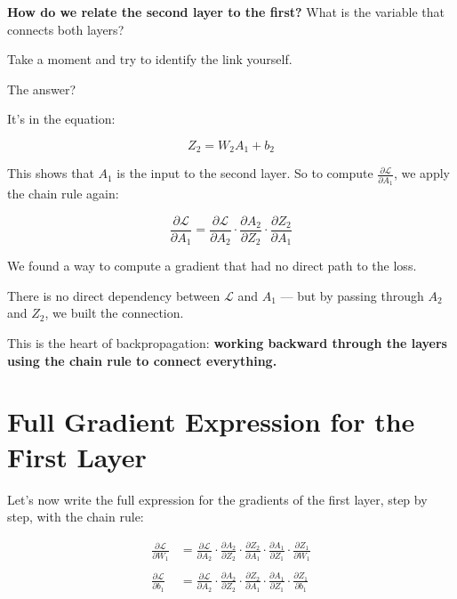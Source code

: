 \documentclass[11pt]{article}
\begin{document}
\begin{warnbox}[title=Pause and Think]
\textbf{How do we relate the second layer to the first?}  
What is the variable that connects both layers?

Take a moment and try to identify the link yourself.
\end{warnbox}

The answer?

It’s in the equation:

\[
Z_2 = W_2 A_1 + b_2
\]

This shows that $A_1$ is the input to the second layer.  
So to compute $\frac{\partial \mathcal{L}}{\partial A_1}$, we apply the chain rule again:

\[
\frac{\partial \mathcal{L}}{\partial A_1} = 
\frac{\partial \mathcal{L}}{\partial A_2} \cdot 
\frac{\partial A_2}{\partial Z_2} \cdot 
\frac{\partial Z_2}{\partial A_1}
\]

\begin{insightbox}[title=What Just Happened]
We found a way to compute a gradient that had no direct path to the loss.

There is no direct dependency between $\mathcal{L}$ and $A_1$ —  
but by passing through $A_2$ and $Z_2$, we built the connection.

This is the heart of backpropagation:  
\textbf{working backward through the layers using the chain rule to connect everything.}
\end{insightbox}

\section{Full Gradient Expression for the First Layer}

Let’s now write the full expression for the gradients of the first layer, step by step, with the chain rule:

\[
\begin{aligned}
\frac{\partial \mathcal{L}}{\partial W_1} &= 
\frac{\partial \mathcal{L}}{\partial A_2} \cdot 
\frac{\partial A_2}{\partial Z_2} \cdot 
\frac{\partial Z_2}{\partial A_1} \cdot 
\frac{\partial A_1}{\partial Z_1} \cdot 
\frac{\partial Z_1}{\partial W_1} \\
\\
\frac{\partial \mathcal{L}}{\partial b_1} &= 
\frac{\partial \mathcal{L}}{\partial A_2} \cdot 
\frac{\partial A_2}{\partial Z_2} \cdot 
\frac{\partial Z_2}{\partial A_1} \cdot 
\frac{\partial A_1}{\partial Z_1} \cdot 
\frac{\partial Z_1}{\partial b_1}
\end{aligned}
\]
\end{document}
